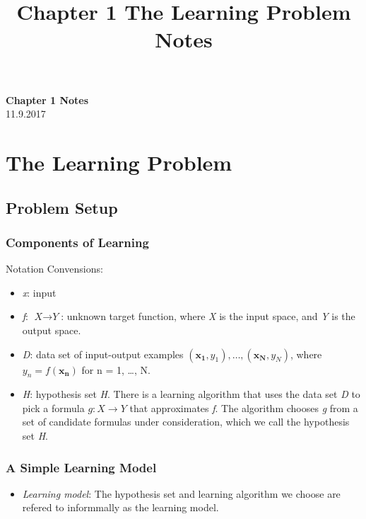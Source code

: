 \documentclass[11pt]{article}
\theoremstyle{definition}
\begin{document}
\setcounter{section}{0}
\title{Chapter 1 The Learning Problem Notes}

\thispagestyle{empty}

\begin{center}
{\LARGE \bf Chapter 1 Notes}\\
11.9.2017
\end{center}
\section{The Learning Problem}
\subsection{Problem Setup}
\subsubsection{Components of Learning}
Notation Convensions:
\begin{itemize}[noitemsep,topsep=0pt]
    \itemsep-1em
    \item \textit{x}: input\\
    \item \textit{f}: $\textit{X} \rightarrow \textit{Y}$: unknown target function, where \textit{X} is the input space, and \textit{Y} is the output space.\\
    \item \textit{D}: data set of input-output examples $(\mathbf{x_1}, y_1), \ldots, (\mathbf{x_N}, y_N)$, where $y_n = f(\mathbf{x_n})$ for n = 1, \ldots, N. \\
    \item \textit{H}: hypothesis set \textit{H}. There is a learning algorithm that uses the data set \textit{D} to pick a formula $\textit{g}: \textit{X} \rightarrow \textit{Y}$ that approximates \textit{f}. The algorithm chooses \textit{g} from a set of candidate formulas under consideration, which we call the hypothesis set \textit{H}.
\end{itemize}


\subsubsection{A Simple Learning Model}
\begin{itemize}[noitemsep, topsep=0pt]
    \item \textit{Learning model}: The hypothesis set and learning algorithm we choose are refered to informmally as the learning model.
\end{itemize}
\end{document}
